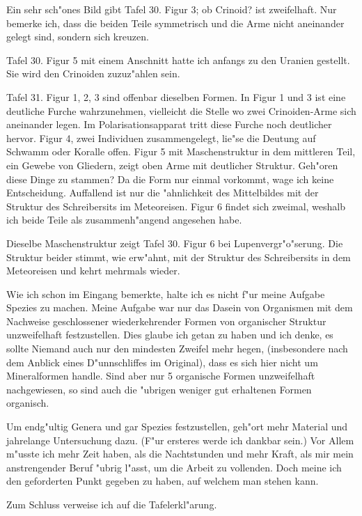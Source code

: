 \documentclass[a4paper, 11pt, oneside]{article}
\begin{document}
Ein sehr sch"ones Bild gibt Tafel 30. Figur 3; ob Crinoid? ist zweifelhaft. Nur bemerke ich, dass die beiden Teile symmetrisch und die Arme nicht aneinander gelegt sind, sondern sich kreuzen.

Tafel 30. Figur 5 mit einem Anschnitt hatte ich anfangs zu den Uranien gestellt. Sie wird den Crinoiden zuzuz"ahlen sein.

Tafel 31. Figur 1, 2, 3 sind offenbar dieselben Formen. In Figur 1 und 3 ist eine deutliche Furche wahrzunehmen, vielleicht die Stelle wo zwei Crinoiden-Arme sich aneinander legen. Im Polarisationsapparat tritt diese Furche noch deutlicher hervor. Figur 4, zwei Individuen zusammengelegt, lie"se die Deutung auf Schwamm oder Koralle offen. Figur 5 mit Maschenstruktur in dem mittleren Teil, ein Gewebe von Gliedern, zeigt oben Arme mit deutlicher Struktur. Geh"oren diese Dinge zu stammen? Da die Form nur einmal vorkommt, wage ich keine Entscheidung. Auffallend ist nur die "ahnlichkeit des Mittelbildes mit der Struktur des Schreibersits im Meteoreisen. Figur 6 findet sich zweimal, weshalb ich beide Teile als zusammenh"angend angesehen habe.

Dieselbe Maschenstruktur zeigt Tafel 30. Figur 6 bei Lupenvergr"o"serung. Die Struktur beider stimmt, wie erw"ahnt, mit der Struktur des Schreibersits in dem Meteoreisen und kehrt mehrmals wieder.

Wie ich schon im Eingang bemerkte, halte ich es nicht f"ur meine Aufgabe Spezies zu machen. Meine Aufgabe war nur das Dasein von Organismen mit dem Nachweise geschlossener wiederkehrender Formen von organischer Struktur unzweifelhaft festzustellen. Dies glaube ich getan zu haben und ich denke, es sollte Niemand auch nur den mindesten Zweifel mehr hegen, (insbesondere nach dem Anblick eines D"unnschliffes im Original), dass es sich hier nicht um Mineralformen handle. Sind aber nur 5 organische Formen unzweifelhaft nachgewiesen, so sind auch die "ubrigen weniger gut erhaltenen Formen organisch.

Um endg"ultig Genera und gar Spezies festzustellen, geh"ort mehr Material und jahrelange Untersuchung dazu. (F"ur ersteres werde ich dankbar sein.) Vor Allem m"usste ich mehr Zeit haben, als die Nachtstunden und mehr Kraft, als mir mein anstrengender Beruf "ubrig l"asst, um die Arbeit zu vollenden. Doch meine ich den geforderten Punkt gegeben zu haben, auf welchem man stehen kann.

Zum Schluss verweise ich auf die Tafelerkl"arung.
\end{document}
